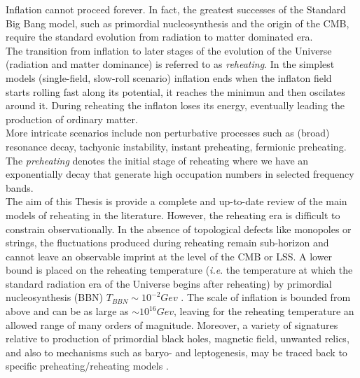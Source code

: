 \documentclass[11pt,a4paper,twoside]{book}
\begin{document}
Inflation cannot proceed forever. In fact, the greatest successes of the Standard Big Bang model, such as primordial nucleosynthesis and the origin of the CMB, require the standard evolution from radiation to matter dominated era.\\ 
The transition from inflation to later stages of the evolution of the Universe (radiation and matter dominance) is referred to as \textit{reheating}. In the simplest models (single-field, slow-roll scenario) inflation ends when the inflaton field starts rolling fast along its potential, it reaches the minimun and then oscilates around it. During reheating the inflaton loses its energy, eventually leading the production of ordinary matter.\\
 More intricate scenarios include non perturbative processes such as (broad) resonance decay, tachyonic instability, instant preheating, fermionic preheating. The \textit{preheating} denotes the initial stage of reheating where we have an exponentially decay that generate high occupation numbers in selected frequency bands.  \\ 
 The aim of this Thesis is provide a complete and up-to-date review of the main models of reheating in the literature.
However, the reheating era is difficult to constrain observationally. In the absence of topological defects like monopoles or strings, the fluctuations produced during reheating remain sub-horizon and cannot leave an observable imprint at the level of the CMB or LSS. A lower bound is placed on the reheating temperature (\textit{i.e}. the temperature at which the standard radiation era of the Universe begins after reheating) by primordial nucleosynthesis (BBN) $ T_{BBN} \sim  10^{-2} Gev $ \cite{Steigman:nucleosynthesisIntro}. The scale of inflation is bounded from above and can be as large as $ \sim 10^{16} Gev $, leaving for the reheating temperature an allowed range of many orders of magnitude. 
Moreover, a variety of signatures relative to production of primordial black holes, magnetic field, unwanted relics, and also to mechanisms such as baryo- and leptogenesis, may be traced back to specific preheating/reheating models \cite{ReheatingPredictionsSingleFieldModel:intro} .\\ 
\end{document}
